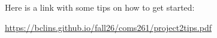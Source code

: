 \documentclass[12pt]{article}
\begin{document}
\begin{enumerate}
\end{enumerate}


\noindent
Here is a link with some tips on how to get started: 
\begin{center}
\url{https://bclins.github.io/fall26/coms261/project2tips.pdf}
\end{center}
\end{document}
